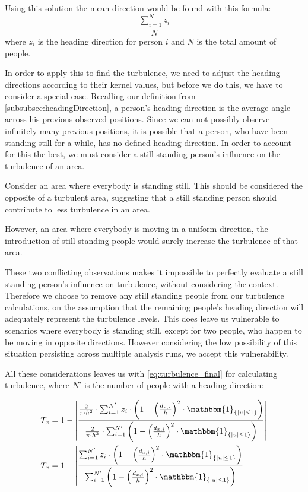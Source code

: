 Using this solution the mean direction would be found with this formula: $$\frac{\sum_{i=1}^{N} z_i}{N}$$ where $z_i$ is the heading direction for person $i$ and $N$ is the total amount of people.

In order to apply this to find the turbulence, we need to adjust the heading directions according to their kernel values, but before we do this, we have to consider a special case. Recalling our definition from \cref{subsubsec:headingDirection}, a person's heading direction is the average angle across his previous observed positions. Since we can not possibly observe infinitely many previous positions, it is possible that a person, who have been standing still for a while, has no defined heading direction. In order to account for this the best, we must consider a still standing person's influence on the turbulence of an area.

Consider an area where everybody is standing still. This should be considered the opposite of a turbulent area, suggesting that a still standing person should contribute to less turbulence in an area.

However, an area where everybody is moving in a uniform direction, the introduction of still standing people would surely increase the turbulence of that area.

These two conflicting observations makes it impossible to perfectly evaluate a still standing person's influence on turbulence, without considering the context. Therefore we choose to remove any still standing people from our turbulence calculations, on the assumption that the remaining people's heading direction will adequately represent the turbulence levels. This does leave us vulnerable to scenarios where everybody is standing still, except for two people, who happen to be moving in opposite  directions. However considering the low possibility of this situation persisting across multiple analysis runs, we accept this vulnerability.

All these considerations leaves us with \cref{eq:turbulence_final} for calculating turbulence, where $N'$ is the number of people with a heading direction:

\begin{equation}
\label{eq:turbulence_final}
\begin{split}
T_x &= 1 - \left|\frac{\frac{2}{\pi \cdot h^2} \cdot \sum_{i=1}^{N'} z_i \cdot \left(1-\left(\frac{d_{x,i}}{h}\right)^2 \cdot \mathbbm{1}_{\{|u| \leq 1\} }\right)}{\frac{2}{\pi \cdot h^2} \cdot \sum_{i=1}^{N'} \left(1-\left(\frac{d_{x,i}}{h}\right)^2 \cdot \mathbbm{1}_{\{|u| \leq 1\} }\right)}\right| \\
%
%
T_x &= 1 - \left|\frac{\sum_{i=1}^{N'} z_i \cdot \left(1-\left(\frac{d_{x,i}}{h}\right)^2 \cdot \mathbbm{1}_{\{|u| \leq 1\} }\right)}{\sum_{i=1}^{N'} \left(1-\left(\frac{d_{x,i}}{h}\right)^2 \cdot \mathbbm{1}_{\{|u| \leq 1\} }\right)}\right|
\end{split}
\end{equation}

